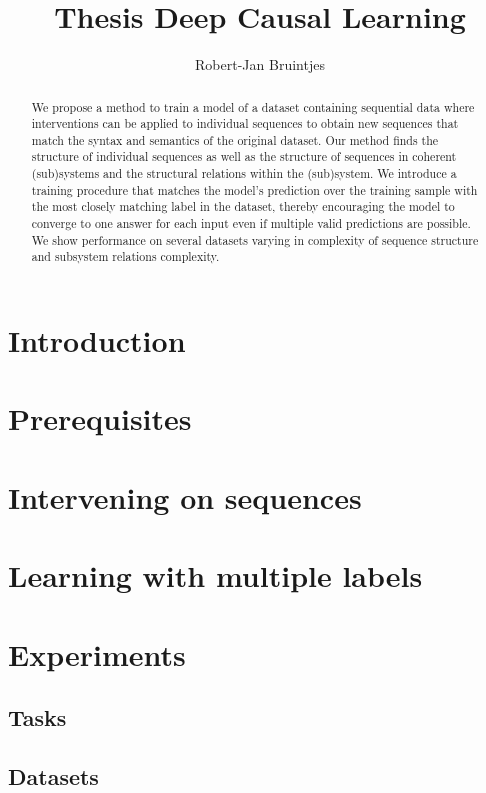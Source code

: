 \documentclass{article} %
\title{Thesis Deep Causal Learning}
\author{Robert-Jan Bruintjes
}
\begin{document}
\maketitle

\begin{abstract}
We propose a method to train a model of a dataset containing sequential data where interventions can be applied to individual sequences to obtain new sequences that match the syntax and semantics of the original dataset.
Our method finds the structure of individual sequences as well as the structure of sequences in coherent (sub)systems and the structural relations within the (sub)system.
We introduce a training procedure that matches the model’s prediction over the training sample with the most closely matching label in the dataset, thereby encouraging the model to converge to one answer for each input even if multiple valid predictions are possible.
We show  performance on several datasets varying in complexity of sequence structure and subsystem relations complexity.
\end{abstract}

\section{Introduction}

\section{Prerequisites}

\section{Intervening on sequences}

\section{Learning with multiple labels}

\section{Experiments}
\subsection{Tasks}
\subsection{Datasets}
\end{document}
